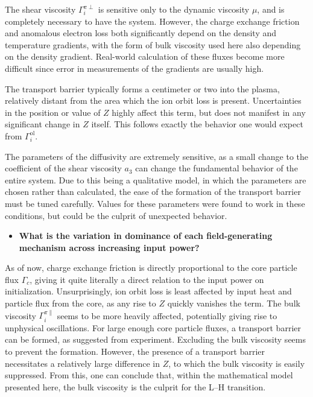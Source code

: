 The shear viscosity $\Gamma_i^{\pi\perp}$ is sensitive only to the dynamic viscosity $\mu$, and is completely necessary to have the system.
However, the charge exchange friction and anomalous electron loss both significantly depend on the density and temperature gradients, with the form of bulk viscosity used here also depending on the density gradient.
Real-world calculation of these fluxes become more difficult since error in measurements of the gradients are usually high.

The transport barrier typically forms a centimeter or two into the plasma, relatively distant from the area which the ion orbit loss is present.
Uncertainties in the position or value of $Z$ highly affect this term, but does not manifest in any significant change in $Z$ itself.
This follows exactly the behavior one would expect from $\Gamma_i^\text{ol}$.

The parameters of the diffusivity are extremely sensitive, as a small change to the coefficient of the shear viscosity $a_3$ can change the fundamental behavior of the entire system.
Due to this being a qualitative model, in which the parameters are chosen rather than calculated, the ease of the formation of the transport barrier must be tuned carefully.
Values for these parameters were found to work in these conditions, but could be the culprit of unexpected behavior.

\begin{itemize}
	\item \textbf{What is the variation in dominance of each field-generating mechanism across increasing input power?}
\end{itemize}

As of now, charge exchange friction is directly proportional to the core particle flux $\Gamma_c$, giving it quite literally a direct relation to the input power on initialization.
Unsurprisingly, ion orbit loss is least affected by input heat and particle flux from the core, as any rise to $Z$ quickly vanishes the term.
The bulk viscosity $\Gamma_i^{\pi\parallel}$ seems to be more heavily affected, potentially giving rise to unphysical oscillations.
For large enough core particle fluxes, a transport barrier can be formed, as suggested from experiment.
Excluding the bulk viscosity seems to prevent the formation.
However, the presence of a transport barrier necessitates a relatively large difference in $Z$, to which the bulk viscosity is easily suppressed.
From this, one can conclude that, within the mathematical model presented here, the bulk viscosity is the culprit for the L--H transition.


